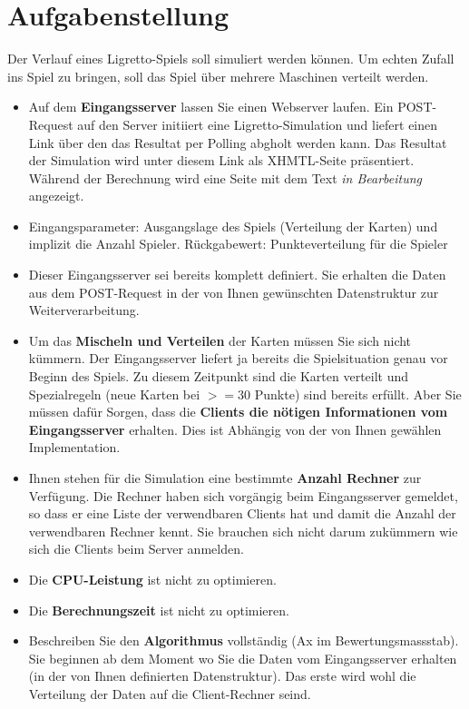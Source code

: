 \section{Aufgabenstellung} 

Der Verlauf eines Ligretto-Spiels soll simuliert werden können. Um echten Zufall ins Spiel zu bringen, soll das Spiel über mehrere Maschinen verteilt werden.

 \begin{itemize}
 \item Auf dem \textbf{Eingangsserver} lassen Sie einen Webserver laufen. Ein POST-Request auf den Server initiiert eine Ligretto-Simulation und liefert einen Link über den das Resultat per Polling abgholt werden kann. Das Resultat der Simulation wird  unter diesem Link als XHMTL-Seite präsentiert. Während der Berechnung wird eine Seite mit dem Text \textit{in Bearbeitung} angezeigt.
 \item Eingangsparameter: Ausgangslage des Spiels (Verteilung der Karten) und implizit die Anzahl Spieler. Rückgabewert: Punkteverteilung für die Spieler
 \item Dieser Eingangsserver sei bereits komplett definiert. Sie erhalten die Daten aus dem POST-Request in der von Ihnen gewünschten Datenstruktur zur Weiterverarbeitung.
 \item Um das \textbf{Mischeln und Verteilen} der Karten müssen Sie sich nicht kümmern. Der Eingangsserver liefert ja bereits die Spielsituation genau vor Beginn des Spiels. Zu diesem Zeitpunkt sind die Karten verteilt und Spezialregeln (neue Karten bei $>= 30$ Punkte) sind bereits erfüllt. Aber Sie müssen dafür Sorgen, dass die \textbf{Clients die nötigen Informationen vom Eingangsserver} erhalten. Dies ist Abhängig von der von Ihnen gewählen Implementation.
 \item Ihnen stehen für die Simulation eine bestimmte \textbf{Anzahl Rechner} zur Verfügung. Die Rechner haben sich vorgängig beim Eingangsserver gemeldet, so dass er eine Liste der verwendbaren Clients hat und damit die Anzahl der verwendbaren Rechner kennt. Sie brauchen sich nicht darum zukümmern wie sich die Clients beim Server anmelden.
 \item Die \textbf{CPU-Leistung} ist nicht zu optimieren.
 \item Die \textbf{Berechnungszeit} ist  nicht zu optimieren.
 \item Beschreiben Sie den \textbf{Algorithmus} vollständig (Ax im Bewertungsmassstab). Sie beginnen ab dem Moment wo Sie die Daten vom Eingangsserver erhalten (in der von Ihnen definierten Datenstruktur). Das erste wird wohl die Verteilung der Daten auf die Client-Rechner seind.

\end{itemize}
